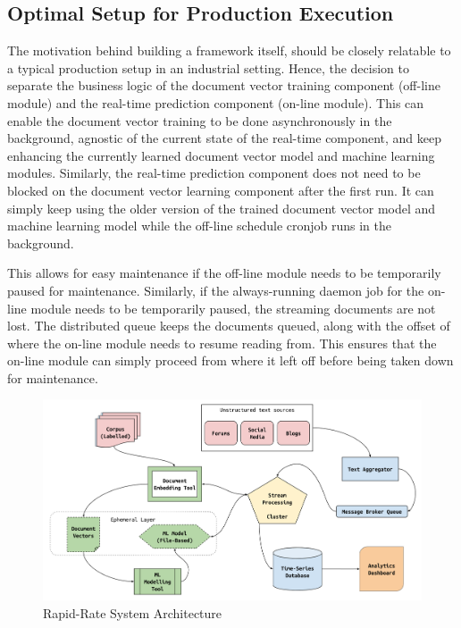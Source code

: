 \documentclass[conference]{IEEEtran}
\begin{document}
    \subsection{Optimal Setup for Production Execution}
        The motivation behind building a framework itself, should be closely relatable to a typical production setup in an industrial setting.
        Hence, the decision to separate the business logic of the document vector training component (off-line module) and the real-time prediction component (on-line module). 
        This can enable the document vector training to be done asynchronously in the background, agnostic of the current state of the real-time component, and keep enhancing the currently learned document vector model and machine learning modules.
        Similarly, the real-time prediction component does not need to be blocked on the document vector learning component after the first run.
        It can simply keep using the older version of the trained document vector model and machine learning model while the off-line schedule cronjob runs in the background.

        This allows for easy maintenance if the off-line module needs to be temporarily paused for maintenance.
        Similarly, if the always-running daemon job for the on-line module needs to be temporarily paused, the streaming documents are not lost. 
        The distributed queue keeps the documents queued, along with the offset of where the on-line module needs to resume reading from. 
        This ensures that the on-line module can simply proceed from where it left off before being taken down for maintenance.

\vspace{5mm}

\begin{figure}[ht] \label{fig:system-architecture}
    \centering
    \includegraphics[width=\textwidth]{images/rapid_rate_system_arch_1.png}
    \caption{Rapid-Rate System Architecture}
\end{figure}
\end{document}
